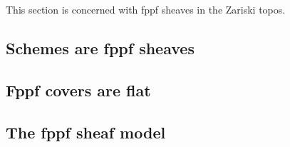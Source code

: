 This section is concerned with fppf sheaves in the Zariski topos.

\subsection{Schemes are fppf sheaves}

\subsection{Fppf covers are flat}

\subsection{The fppf sheaf model}